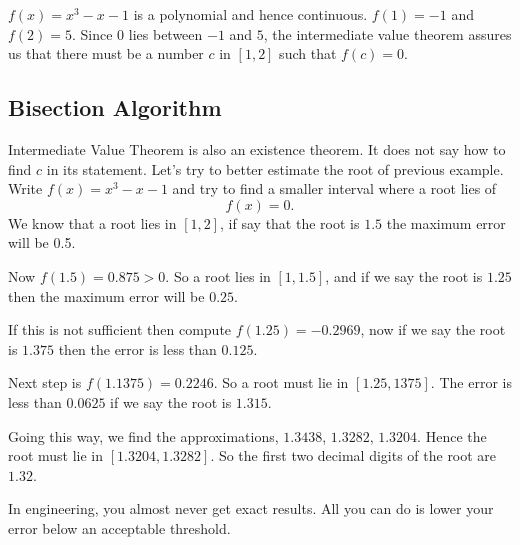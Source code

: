 \documentclass[../main.tex]{subfiles}
\begin{document}
\begin{solution}
	$f(x) = x^3 - x - 1$ is a polynomial and hence continuous. $f(1) = -1$ and $f(2) = 5$. Since $0$ lies between $-1$ and $5$, the intermediate value theorem assures us that there must be a number $c$ in $[1, 2]$ such that $f(c) = 0$.
\end{solution}

\subsection*{Bisection Algorithm}
Intermediate Value Theorem is also an existence theorem. It does not say how to find $c$ in its statement. Let's try to better estimate the root of previous example. Write $f(x) = x^3 - x - 1$ and try to find a smaller interval where a root lies of
\[
	f(x) = 0.
\]
We know that a root lies in $[1, 2]$, if say that the root is $1.5$ the maximum error will be 0.5.

Now $f(1.5)=0.875 > 0$. So a root lies in $[1, 1.5]$, and if we say the root is $1.25$ then the maximum error will be $0.25$.

If this is not sufficient then compute $f(1.25)=-0.2969$, now if we say the root is $1.375$ then the error is less than $0.125$.

Next step is $f(1.1375) = 0.2246$. So a root must lie in $[1.25, 1375]$. The error is less than $0.0625$ if we say the root is $1.315$.

Going this way, we find the approximations, $1.3438$, $1.3282$, $1.3204$. Hence the root must lie in $[1.3204, 1.3282]$. So the first two decimal digits of the root are $1.32$.

In engineering, you almost never get exact results. All you can do is lower your error below an acceptable threshold.
\end{document}
